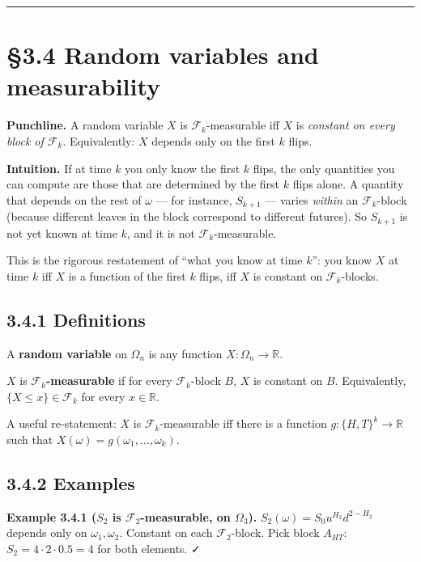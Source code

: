 \documentclass[
  10pt,
  twoside]{book}
\begin{document}
\begin{center}\rule{0.5\linewidth}{0.5pt}\end{center}

\section{§3.4 Random variables and
measurability}\label{random-variables-and-measurability}

\textbf{Punchline.} A random variable \(X\) is
\(\mathcal F_k\)-measurable iff \(X\) is \emph{constant on every block
of \(\mathcal F_k\)}. Equivalently: \(X\) depends only on the first
\(k\) flips.

\textbf{Intuition.} If at time \(k\) you only know the first \(k\)
flips, the only quantities you can compute are those that are determined
by the first \(k\) flips alone. A quantity that depends on the rest of
\(\omega\) --- for instance, \(S_{k+1}\) --- varies \emph{within} an
\(\mathcal F_k\)-block (because different leaves in the block correspond
to different futures). So \(S_{k+1}\) is not yet known at time \(k\),
and it is not \(\mathcal F_k\)-measurable.

This is the rigorous restatement of ``what you know at time \(k\)'': you
know \(X\) at time \(k\) iff \(X\) is a function of the first \(k\)
flips, iff \(X\) is constant on \(\mathcal F_k\)-blocks.

\subsection{3.4.1 Definitions}\label{definitions-9}

A \textbf{random variable} on \(\Omega_n\) is any function
\(X : \Omega_n \to \mathbb R\).

\(X\) is \textbf{\(\mathcal F_k\)-measurable} if for every
\(\mathcal F_k\)-block \(B\), \(X\) is constant on \(B\). Equivalently,
\(\{X \le x\} \in \mathcal F_k\) for every \(x \in \mathbb R\).

A useful re-statement: \(X\) is \(\mathcal F_k\)-measurable iff there is
a function \(g : \{H,T\}^k \to \mathbb R\) such that
\(X(\omega) = g(\omega_1, \ldots, \omega_k)\).

\subsection{3.4.2 Examples}\label{examples-14}

\textbf{Example 3.4.1 (\(S_2\) is \(\mathcal F_2\)-measurable, on
\(\Omega_3\)).} \(S_2(\omega) = S_0 u^{H_2} d^{2 - H_2}\) depends only
on \(\omega_1, \omega_2\). Constant on each \(\mathcal F_2\)-block. Pick
block \(A_{HT}\): \(S_2 = 4 \cdot 2 \cdot 0.5 = 4\) for both elements. ✓
\end{document}
